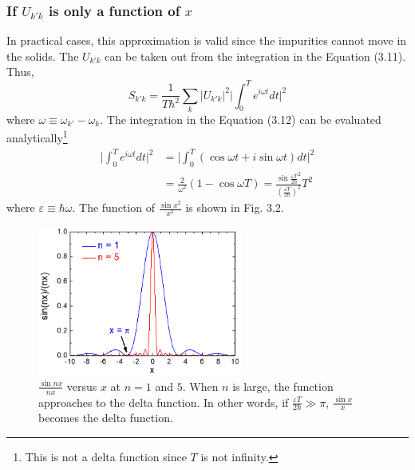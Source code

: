\subsubsection{If $U_{k'k}$ is only a function of $x$}
In practical cases, this approximation is valid since the impurities cannot move in the solids. The $U_{k'k}$ can be taken out from the integration in the Equation (3.11). Thus, \begin{equation}
    S_{k'k} = \frac{1}{T\hbar^{2}}\sum_{k}\big|U_{k'k}\big|^{2}\big|\int_{0}^{T}e^{i\omega t}dt\big|^{2}
\end{equation} where $\omega \equiv \omega_{k'}-\omega_{k}$. The integration in the Equation (3.12) can be evaluated analytically\footnote{This is not a delta function since $T$ is not infinity.} \begin{align}
    \big|\int_{0}^{T}e^{i\omega t}dt\big|^{2}& = \big|\int_{0}^{T}(\cos{\omega t}+i\sin{\omega t})dt\big|^{2}\nonumber\\
    & = \frac{2}{\omega^{2}}(1-\cos{\omega T}) = \frac{\sin{\frac{\varepsilon T}{2\hbar}}^{2}}{(\frac{\varepsilon T}{2\hbar})^{2}}T^{2}
\end{align} where $\varepsilon \equiv \hbar \omega$. The function of $\frac{\sin{x}^{2}}{x^{2}}$ is shown in Fig. 3.2.
\begin{figure}[tbp]
\includegraphics[width=0.6\textwidth]{figures/Fig3_2}
\centering
\caption{\small $\frac{\sin{nx}}{nx}$ versus $x$ at $n = 1$ and $5$. When $n$ is large, the function approaches to the delta function. In other words, if $\frac{\varepsilon T}{2\hbar}\gg\pi$, $\frac{\sin{x}}{x}$ becomes the delta function.}
\end{figure}
